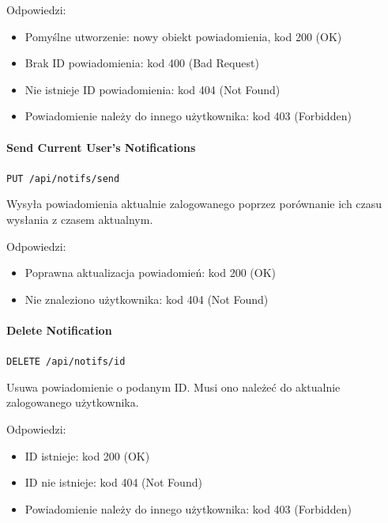 \documentclass[a4paper,twoside,12pt]{book}
\begin{document}
Odpowiedzi: 
\begin{itemize}
	\item Pomyślne utworzenie: nowy obiekt powiadomienia, kod 200 (OK) 
	\item Brak ID powiadomienia: kod 400 (Bad Request) 
	\item Nie istnieje ID powiadomienia: kod 404 (Not Found)
	\item Powiadomienie należy do innego użytkownika: kod 403 (Forbidden)
\end{itemize}

\paragraph{Send Current User's Notifications}

\texttt{PUT /api/notifs/send}

Wysyła powiadomienia aktualnie zalogowanego poprzez porównanie ich czasu wysłania z czasem aktualnym.

Odpowiedzi: 
\begin{itemize}
	\item Poprawna aktualizacja powiadomień: kod 200 (OK) 
	\item Nie znaleziono użytkownika: kod 404 (Not Found)
\end{itemize}

\paragraph{Delete Notification}

\texttt{DELETE /api/notifs/{id}}

Usuwa powiadomienie o podanym ID. Musi ono należeć do aktualnie zalogowanego użytkownika.

Odpowiedzi: 
\begin{itemize}
	\item ID istnieje: kod 200 (OK) 
	\item ID nie istnieje: kod 404 (Not Found)
	\item Powiadomienie należy do innego użytkownika: kod 403 (Forbidden)
\end{itemize}

%      
\end{document}
